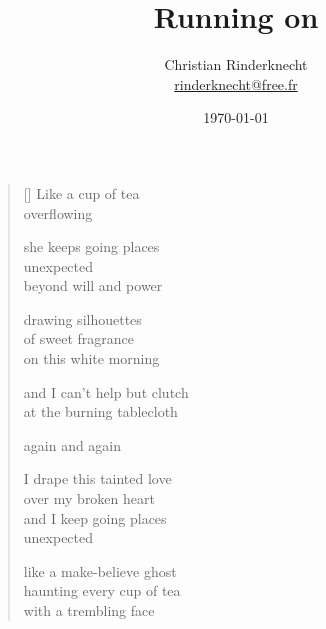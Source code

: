 \documentclass[12pt,a4paper]{article}
\title{Running on}
\author{Christian Rinderknecht\\
{\small \url{rinderknecht@free.fr}}}
\date{\small\today}
\begin{document}
\maketitle


\thispagestyle{empty}


\newpage\leavevmode\thispagestyle{empty}\newpage


\newpage

\poemtitle{}

\settowidth{\versewidth}{Like a make-believe ghost}

\bigskip

\begin{verse}[\versewidth]
  Like a cup of tea \\
  overflowing

  she keeps going places \\
  unexpected \\
  beyond will and power

  drawing silhouettes \\
  of sweet fragrance \\
  on this white morning

  and I can't help but clutch \\
  at the burning tablecloth

  again and again

  I drape this tainted love \\
  over my broken heart \\
  and I keep going places \\
  unexpected

  like a make-believe ghost \\
  haunting every cup of tea \\
  with a trembling face
\end{verse}


\newpage

\poemtitle{}

\settowidth{\versewidth}{You hand me a second jar}

\bigskip
\end{document}
